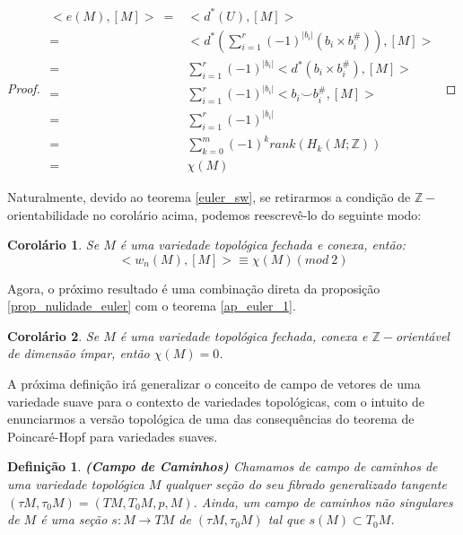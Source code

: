\documentclass[12pt,oneside]{book} %
\newtheorem{defi}   {\hspace{0.5cm}Defini\c c\~ao}[chapter]
\newtheorem{cor}    {\hspace{0.5cm}Corol\'ario}[chapter]
\newcommand{\ds}{\displaystyle}
\newcommand{\Z}{\mathbb{Z}}
\newcommand{\ccup}{\smile}
\begin{document}
\begin{proof}
	$ \begin{array}{rl}
		<e(M),[M]> \ = & <d^{*}(U),[M]> \\
		= & <d^{*}\left( \ds\sum_{i=1}^{r} (-1)^{|b_{i}|}\left( b_{i}\times b_{i}^{\#} \right) \right),[M]> \\
		= & \ds\sum_{i=1}^{r}(-1)^{|b_{i}|}<d^{*}(b_{i}\times b_{i}^{\#}),[M]> \\
		= & \ds\sum_{i=1}^{r}(-1)^{|b_{i}|}<b_{i}\ccup b_{i}^{\#},[M]> \\
		= & \ds\sum_{i=1}^{r}(-1)^{|b_{i}|} \\
		= & \ds\sum_{k=0}^{m}(-1)^{k}rank(H_{k}(M;\Z)) \\
		= & \chi(M)
	\end{array} $
	
\end{proof}

\par Naturalmente, devido ao teorema \ref{euler_sw}, se retirarmos a condição de $\Z-$orientabilidade no corolário acima, podemos reescrevê-lo do seguinte modo:

\begin{cor}\label{ap_euler_3}
	Se $M$ é uma variedade topológica fechada e conexa, então:
	$$ <w_{n}(M),[M]>\equiv\chi(M) (mod \ 2) $$
\end{cor}

\par Agora, o próximo resultado é uma combinação direta da proposição \ref{prop_nulidade_euler} com o teorema \ref{ap_euler_1}.

\begin{cor}
	Se $M$ é uma variedade topológica fechada, conexa e $\Z-$orientável de dimensão ímpar, então $\chi(M)=0$.
\end{cor}

\par A próxima definição irá generalizar o conceito de campo de vetores de uma variedade suave para o contexto de variedades topológicas, com o intuito de enunciarmos a versão topológica de uma das consequências do teorema de Poincaré-Hopf para variedades suaves.

\begin{defi}{\bf (Campo de Caminhos)}
	Chamamos de campo de caminhos de uma variedade topológica $M$ qualquer seção do seu fibrado generalizado tangente $(\tau M,\tau_{0}M)=(TM,T_{0}M,p,M)$. Ainda, um campo de caminhos não singulares de $M$ é uma seção $s:M\to TM$ de $(\tau M,\tau_{0}M)$ tal que $s(M)\subset T_{0}M$.
\end{defi}
\end{document}

